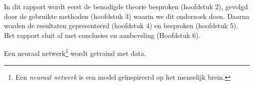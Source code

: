In dit rapport wordt eerst de benodigde theorie besproken (hoofdstuk 2), gevolgd door de gebruikte methoden (hoofdstuk 3) waarin we dit onderzoek doen. Daarna worden de resultaten gepresenteerd (hoofdstuk 4) en besproken (hoofdstuk 5). Het rapport sluit af met conclusies en aanbeveling (Hoofdstuk 6).

Een neuraal netwerk\footnote{Een \textit{neuraal netwerk} is een model geïnspireerd op het menselijk brein.} wordt getraind met data.

